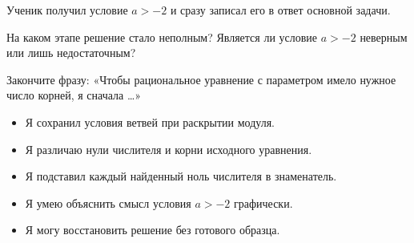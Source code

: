 \begin{practicebox}
  Ученик получил условие \(a>-2\) и сразу записал его в ответ основной
  задачи.

  На каком этапе решение стало неполным? Является ли условие \(a>-2\)
  неверным или лишь недостаточным?
\end{practicebox}

\begin{reflectionbox}
  Закончите фразу: «Чтобы рациональное уравнение с параметром имело нужное
  число корней, я сначала \ldots»
\end{reflectionbox}

\begin{questionsbox}
  \begin{itemize}[label=\(\square\)]
    \item Я сохранил условия ветвей при раскрытии модуля.
    \item Я различаю нули числителя и корни исходного уравнения.
    \item Я подставил каждый найденный ноль числителя в знаменатель.
    \item Я умею объяснить смысл условия \(a>-2\) графически.
    \item Я могу восстановить решение без готового образца.
  \end{itemize}
\end{questionsbox}
